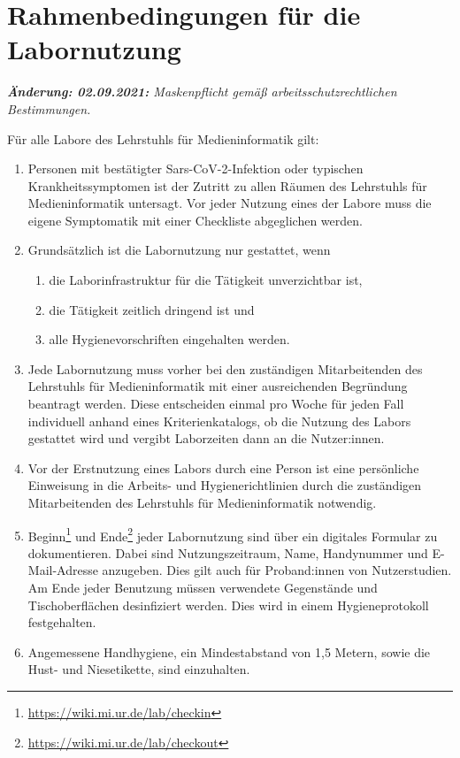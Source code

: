 \section{Rahmenbedingungen für die Labornutzung}\label{sec:allgemein}
\emph{\textbf{Änderung: 02.09.2021:} Maskenpflicht gemäß arbeitsschutzrechtlichen Bestimmungen.}

\noindent
Für alle Labore des Lehrstuhls für Medieninformatik gilt:

\begin{enumerate}
    \item{Personen mit bestätigter Sars-CoV-2-Infektion oder typischen Krankheitssymptomen ist der Zutritt zu allen Räumen des Lehrstuhls für Medieninformatik untersagt. Vor jeder Nutzung eines der Labore muss die eigene Symptomatik mit einer Checkliste abgeglichen werden.}
    \item Grundsätzlich ist die Labornutzung nur gestattet, wenn
    \begin{enumerate}
        \item die Laborinfrastruktur für die Tätigkeit unverzichtbar ist,
        \item die Tätigkeit zeitlich dringend ist und 
        \item alle Hygienevorschriften eingehalten werden.
    \end{enumerate}
    \item{Jede Labornutzung muss vorher bei den zuständigen Mitarbeitenden des Lehrstuhls für Medieninformatik mit einer ausreichenden Begründung beantragt werden. Diese entscheiden einmal pro Woche für jeden Fall individuell anhand eines Kriterienkatalogs, ob die Nutzung des Labors gestattet wird und vergibt Laborzeiten dann an die Nutzer:innen.}
    \item{Vor der Erstnutzung eines Labors durch eine Person ist eine persönliche Einweisung in die Arbeits- und Hygienerichtlinien durch die zuständigen Mitarbeitenden des Lehrstuhls für Medieninformatik notwendig.}
    \item{Beginn\footnote{\url{https://wiki.mi.ur.de/lab/checkin}} und Ende\footnote{\url{https://wiki.mi.ur.de/lab/checkout}} jeder Labornutzung sind über ein digitales Formular zu dokumentieren.
    Dabei sind Nutzungszeitraum, Name, Handynummer und E-Mail-Adresse anzugeben.
    Dies gilt auch für Proband:innen von Nutzerstudien.
    Am Ende jeder Benutzung müssen verwendete Gegenstände und Tischoberflächen desinfiziert werden.
    Dies wird in einem Hygieneprotokoll festgehalten.}
    \item{Angemessene Handhygiene, ein Mindestabstand von 1,5 Metern, sowie die Hust- und Niesetikette, sind einzuhalten.

}
\end{enumerate}
